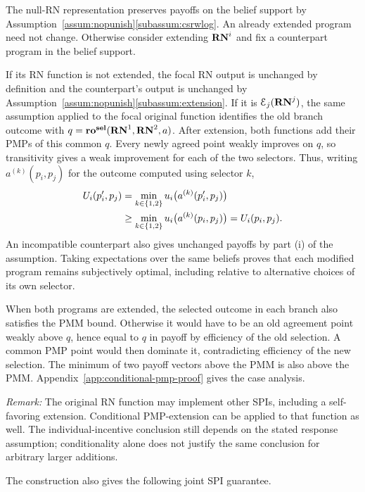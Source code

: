 \documentclass[sigconf]{aamas}
\newcommand{\selection}{sel}%
\newcommand{\renegb}{\mathbf{\selection}}
\theoremstyle{definition}
\begin{document}
\begin{sketch}
The null-RN representation preserves payoffs on the belief support by
Assumption~\ref{assum:nopunish}\ref{subassum:csrwlog}.
An already extended program need not change. Otherwise consider
extending $\mathbf{RN}^{i}$ and fix a counterpart program in the belief support.

If its RN function is not extended, the focal RN output is unchanged
by definition and the counterpart's output is unchanged by
Assumption~\ref{assum:nopunish}\ref{subassum:extension}.
If it is $\mathcal E_j(\mathbf{RN}^{j})$, the same assumption applied to the
focal original function identifies the old branch outcome with
$q=\bargdefault^{\renegb}(\renegone,\renegtwo,a)$.
After extension, both functions add their PMPs of this common $q$.
Every newly agreed point weakly improves on $q$, so transitivity gives
a weak improvement for each of the two selectors. Thus, writing
$a^{(k)}(p_i,p_j)$ for the outcome computed using selector $k$,
\begin{align*}
 U_i(p_i',p_j)
 &=\min_{k\in\{1,2\}}u_i\bigl(a^{(k)}(p_i',p_j)\bigr)\\
 &\geq\min_{k\in\{1,2\}}u_i\bigl(a^{(k)}(p_i,p_j)\bigr)
 =U_i(p_i,p_j).
\end{align*}
An incompatible counterpart also gives unchanged payoffs by part (i)
of the assumption. Taking expectations over the same beliefs proves
that each modified program remains subjectively optimal, including
relative to alternative choices of its own selector.

When both programs are extended, the selected outcome in each branch
also satisfies the PMM bound. Otherwise it would have to be an old
agreement point weakly above $q$, hence equal to $q$ in payoff by
efficiency of the old selection. A common PMP point would then dominate
it, contradicting efficiency of the new selection.
The minimum of two payoff vectors above the PMM is also above the PMM.
Appendix~\ref{app:conditional-pmp-proof} gives the case analysis.
\end{sketch}

\textit{Remark:} The original RN function may implement other SPIs,
including a self-favoring extension. Conditional PMP-extension can be
applied to that function as well. The individual-incentive conclusion
still depends on the stated response assumption; conditionality alone
does not justify the same conclusion for arbitrary larger additions.

The construction also gives the following joint SPI guarantee.
\end{document}
